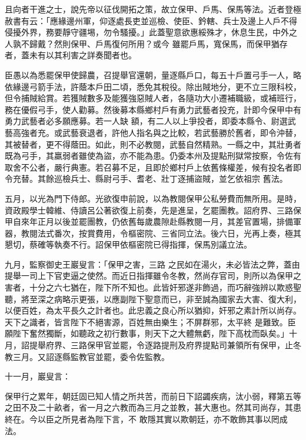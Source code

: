\begin{pinyinscope}
 且向者干進之士，說先帝以征伐開拓之策，故立保甲、戶馬、保馬等法。近者登極赦書有云：「應緣邊州軍，仰逐處長吏並巡檢、使臣、鈐轄、兵士及邊上人戶不得侵擾外界，務要靜守疆埸，勿令騷擾。」此蓋聖意欲惠綏殊才，休息生民，中外之人孰不歸戴？然則保甲、戶馬復何所用？或今
 雖罷戶馬，寬保馬，而保甲猶存者，蓋未有以其利害之詳奏聞者也。



 臣愚以為悉罷保甲使歸農，召提舉官還朝，量逐縣戶口，每五十戶置弓手一人，略依緣邊弓箭手法，許蔭本戶田二頃，悉免其稅役。除出賊地分，更不立三限科校，但令捕賊給賞。若獲賊數多及能獲強惡賊人者，各隨功大小遷補職級，或補班行，務在優假弓手，使人勸募。然後募本縣鄉村戶有勇力武藝者投充，計即今保甲中有勇力武藝者必多願應募。若一人缺
 額，有二人以上爭投者，即委本縣令、尉選武藝高強者充。或武藝衰退者，許他人指名與之比較，若武藝勝於舊者，即令沖替，其被替者，更不得蔭田。如此，則不必教閱，武藝自然精熟。一縣之中，其壯勇者既為弓手，其羸弱者雖使為盜，亦不能為患。仍委本州及提點刑獄常按察，令佐有取舍不公者，嚴行典憲。若召募不足，且即於鄉村戶上依舊條權差，候有投名者即令充替。其餘巡檢兵士、縣尉弓手、耆老、壯丁逐捕盜賊，並乞依祖宗
 舊法。



 五月，以光為門下侍郎。光欲復申前說，以為教閱保甲公私勞費而無所用。是時，資政殿學士韓維、侍讀呂公著欲復上前奏，先是進呈，乞罷團教。詔府界、三路保甲自來年正月以後並罷團教，仍依舊每歲農隙赴縣教閱一月，其差官置場，排備軍器，教閱法式番次，按賞費用，令樞密院、三省同立法。後六日，光再上奏，極其懇切，蔡確等執奏不行。詔保甲依樞密院已得指揮，保馬別議立法。



 九月，監察御史王巖叟言：「保甲之害，三路
 之民如在湯火，未必皆法之弊，蓋由提舉一司上下官吏逼之使然。而近日指揮雖令冬教，然尚存官司，則所以為保甲之害者，十分之六七猶在，陛下所不知也。此皆奸邪遂非飾過，而巧辭強辨以欺惑聖聽，將至深之病略示更張，以應副陛下聖意而已，非至誠為國家去大害、復大利，以便百姓，為太平長久之計者也。此忠義之良心所以猶抑，奸邪之素計所以尚存。天下之識者，皆言陛下不絕害源，百姓無由樂生；不屏群邪，太平終
 是難致。臣願陛下奮然獨斷，如聽政之初行數事，則天下之大體無虧，陛下高枕而臥矣。」十月，詔提舉府界、三路保甲官並罷，令逐路提刑及府界提點司兼領所有保甲，止冬教三月。又詔逐縣監教官並罷，委令佐監教。



 十一月，巖叟言：



 保甲行之累年，朝廷固已知人情之所共苦，而前日下詔蠲疾病，汰小弱，釋第五等之田不及二十畝者，省一月之六教而為三月之並教，甚大惠也。然其司尚存，其患終在。今以臣之所見者為陛下言，不
 敢隱其實以欺朝廷，亦不敢飾其事以罔成法。




\end{pinyinscope}
